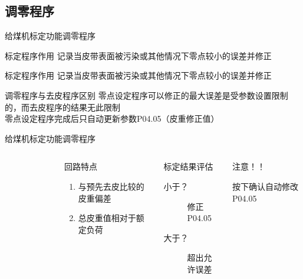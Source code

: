 \documentclass[12pt,hyperref={CJKbookmarks=true}]{beamer} %
\begin{document}
\subsection{调零程序}
\begin{frame}{给煤机标定功能}{调零程序}
  		\begin{block}{标定程序作用}
  		记录当皮带表面被污染或其他情况下零点较小的误差并修正
\end{block}
	\begin{block}{标定程序作用}
  		记录当皮带表面被污染或其他情况下零点较小的误差并修正
\end{block}
\begin{block}{调零程序与去皮程序区别}
  		零点设定程序可以修正的最大误差是受参数设置限制的，而去皮程序的结果无此限制\\
零点设定程序完成后只自动更新参数P04.05（皮重修正值）
\end{block}
	\end{frame}
	\begin{frame}{给煤机标定功能}{调零程序}
  		\begin{columns}
\begin{figure}
	
\end{figure}
\begin{block}{回路特点}
			\begin{enumerate}
				\item  与预先去皮比较的皮重偏差
				\item  总皮重值相对于额定负荷
				\end{enumerate}
\end{block}
\begin{exampleblock}{标定结果评估}
			\begin{description}
				\item[小于？]修正P04.05
				\item[大于？]超出允许误差
				\end{description}
\end{exampleblock}
\begin{alertblock}{注意！！}
			
				按下确认自动修改P04.05
\end{alertblock}
		\end{columns}
	\end{frame}
\end{document}
